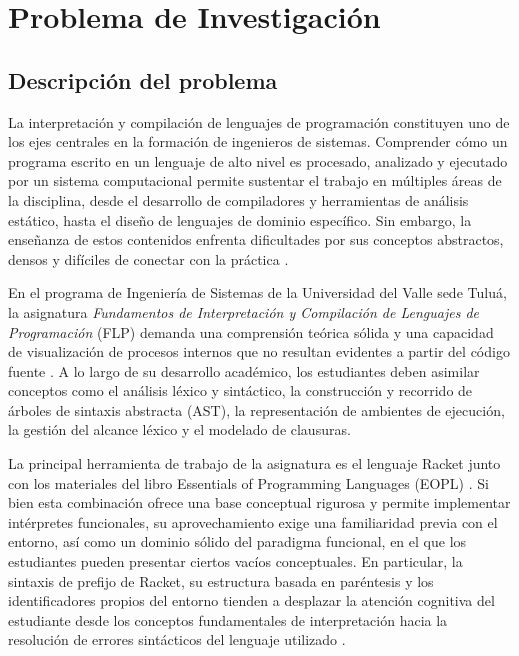\section{Problema de Investigación}

\subsection{Descripción del problema}
La interpretación y compilación de lenguajes de programación constituyen uno de los ejes centrales en la formación de ingenieros de sistemas. Comprender cómo un programa escrito en un lenguaje de alto nivel es procesado, analizado y ejecutado por un sistema computacional permite sustentar el trabajo en múltiples áreas de la disciplina, desde el desarrollo de compiladores y herramientas de análisis estático, hasta el diseño de lenguajes de dominio específico. Sin embargo, la enseñanza de estos contenidos enfrenta dificultades por sus conceptos abstractos, densos y difíciles de conectar con la práctica \cite{liu2017evaluation,navas2022modular}.

En el programa de Ingeniería de Sistemas de la Universidad del Valle sede Tuluá, la asignatura \textit{Fundamentos de Interpretación y Compilación de Lenguajes de Programación} (FLP) demanda una comprensión teórica sólida y una capacidad de visualización de procesos internos que no resultan evidentes a partir del código fuente \cite{Stamenkovic2024AWE}. A lo largo de su desarrollo académico, los estudiantes deben asimilar conceptos como el análisis léxico y sintáctico, la construcción y recorrido de árboles de sintaxis abstracta (AST), la representación de ambientes de ejecución, la gestión del alcance léxico y el modelado de clausuras.

La principal herramienta de trabajo de la asignatura es el lenguaje Racket junto con los materiales del libro Essentials of Programming Languages (EOPL) \cite{Friedman2008EPL}. Si bien esta combinación ofrece una base conceptual rigurosa y permite implementar intérpretes funcionales, su aprovechamiento exige una familiaridad previa con el entorno, así como un dominio sólido del paradigma funcional, en el que los estudiantes pueden presentar ciertos vacíos conceptuales. En particular, la sintaxis de prefijo de Racket, su estructura basada en paréntesis y los identificadores propios del entorno tienden a desplazar la atención cognitiva del estudiante desde los conceptos fundamentales de interpretación hacia la resolución de errores sintácticos del lenguaje utilizado \cite{Spigariol2023Aprendiendo}.


